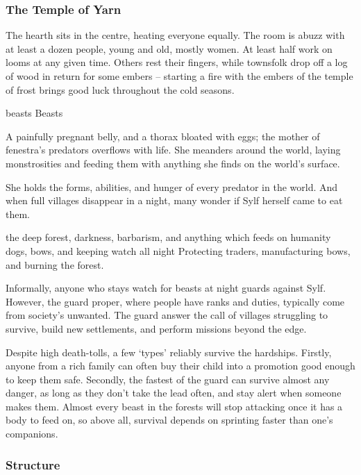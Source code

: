 \begin{multicols}{2}
\subsubsection{The Temple of Yarn}

The hearth sits in the centre, heating everyone equally.
The room is abuzz with at least a dozen people, young and old, mostly women.
At least half work on looms at any given time.
Others rest their fingers, while townsfolk drop off a log of wood in return for some embers -- starting a fire with the embers of the temple of frost brings good luck throughout the cold seasons.


  {\gls{beasts}}%
  {Beasts}%
  {%
    A painfully pregnant belly, and a thorax bloated with eggs; the mother of \gls{fenestra}'s predators overflows with life.
    She meanders around the world, laying monstrosities and feeding them with anything she finds on the world's surface.

    She holds the forms, abilities, and hunger of every predator in the world.
    And when full \glspl{village} disappear in a night, many wonder if Sylf herself came to eat them.
  }%
  {the deep forest, darkness, barbarism, and anything which feeds on humanity}%
  {dogs, bows, and keeping watch all night}%
  {}%
  {
    Protecting traders, manufacturing bows, and burning the forest.
  }%

Informally, anyone who stays watch for beasts at night guards against Sylf.
However, the \gls{guard} proper, where people have ranks and duties, typically come from society's unwanted.
The \gls{guard} answer the call of \glspl{village} struggling to survive, build new settlements, and perform missions beyond the \gls{edge}.

Despite high death-tolls, a few `types' reliably survive the hardships.
Firstly, anyone from a rich family can often buy their child into a promotion good enough to keep them safe.
Secondly, the fastest of the \gls{guard} can survive almost any danger, as long as they don't take the lead often, and stay alert when someone makes them.
Almost every beast in the forests will stop attacking once it has a body to feed on, so above all, survival depends on sprinting faster than one's companions.

\subsubsection{Structure}


\end{multicols}
